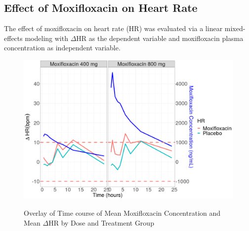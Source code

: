 \documentclass[
]{article}
\begin{document}
\captionsetup{justification = RaggedRight,singlelinecheck=false}


\label{tab:pksum} \clearpage

\hypertarget{effect-of-moxifloxacin-on-heart-rate-1}{%
\subsection{Effect of Moxifloxacin on Heart
Rate}\label{effect-of-moxifloxacin-on-heart-rate-1}}

The effect of moxifloxacin on heart rate (HR) was evaluated via a linear
mixed-effects modeling with \(\Delta\)HR as the dependent variable and
moxifloxacin plasma concentration as independent variable.

\captionsetup{justification = centering}


\label{tab:moxiHR}

\begin{figure}[H]
\caption{Overlay of Time course of Mean Moxifloxacin Concentration and Mean $\Delta$HR by Dose and Treatment Group} 
\includegraphics[width=\textwidth]{../Report/Figures/DHR_pk.png}
\label{fig:DHR_pk}
\end{figure}
\end{document}
